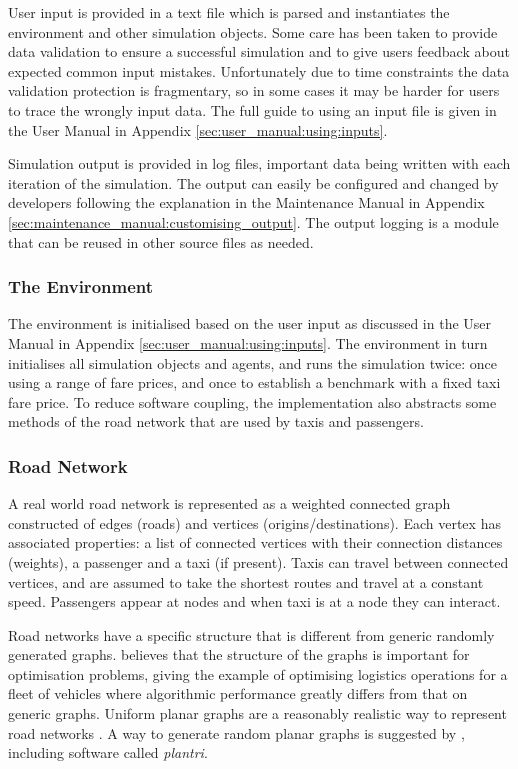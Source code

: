 User input is provided in a text file which is parsed and instantiates the
environment and other simulation objects. Some care has been taken to provide
data validation to ensure a successful simulation and to give users feedback
about expected common input mistakes. Unfortunately due to time constraints the
data validation protection is fragmentary, so in some cases it may be harder
for users to trace the wrongly input data. The full guide to using an input
file is given in the User Manual in Appendix
\ref{sec:user_manual:using:inputs}.

Simulation output is provided in log files, important data being written with
each iteration of the simulation. The output can easily be configured and
changed by developers following the explanation in the Maintenance Manual in
Appendix \ref{sec:maintenance_manual:customising_output}. The output logging is
a module that can be reused in other source files as needed.


\subsubsection{The Environment}
\label{sec:implementation:software:environment}

The environment is initialised based on the user input as discussed in the User
Manual in Appendix \ref{sec:user_manual:using:inputs}. The environment in turn
initialises all simulation objects and agents, and runs the simulation twice:
once using a range of fare prices, and once to establish a benchmark with a
fixed taxi fare price. To reduce software coupling, the implementation also
abstracts some methods of the road network that are used by taxis and
passengers.


\subsubsection{Road Network}
\label{sec:implementation:software:roads}

A real world road network is represented as a weighted connected graph
constructed of edges (roads) and vertices (origins/destinations). Each vertex
has associated properties: a list of connected vertices with their connection
distances (weights), a passenger and a taxi (if present). Taxis can travel
between connected vertices, and are assumed to take the shortest routes and
travel at a constant speed. Passengers appear at nodes and when taxi is at a
node  they can interact.

Road networks have a specific structure that is different from generic randomly
generated graphs. \textcite{Eisenstat2011graphs+quadtree} believes that the
structure of the graphs is important for optimisation problems, giving the
example of optimising logistics operations for a fleet of vehicles where
algorithmic performance greatly differs from that on generic graphs. Uniform
planar graphs are a reasonably realistic way to represent road networks
\parencite{Eisenstat2011graphs+quadtree, Masucci2009graphs+london}. A way to
generate random planar graphs is suggested by
\textcite{Brinkmann2007graphs+generate}, including software called
\textit{plantri}.

